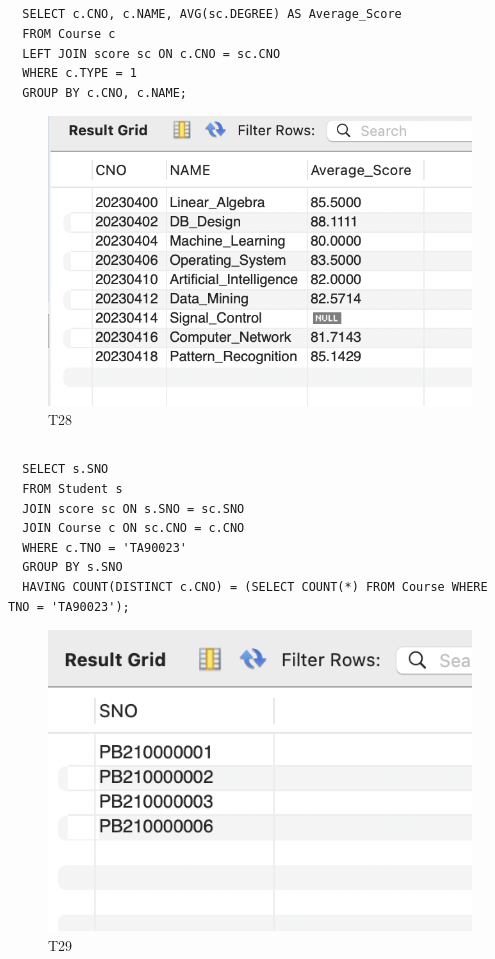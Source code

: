 \documentclass[UTF8]{ctexart}
\begin{document}
\subsection{}
\begin{lstlisting}
  SELECT c.CNO, c.NAME, AVG(sc.DEGREE) AS Average_Score
  FROM Course c
  LEFT JOIN score sc ON c.CNO = sc.CNO
  WHERE c.TYPE = 1
  GROUP BY c.CNO, c.NAME;  
\end{lstlisting}
\begin{figure}[H]
  \centering
  \includegraphics[scale=0.7]{pics/28.png}
  \caption*{T28}
\end{figure}

\subsection{}
\begin{lstlisting}
  SELECT s.SNO
  FROM Student s
  JOIN score sc ON s.SNO = sc.SNO
  JOIN Course c ON sc.CNO = c.CNO
  WHERE c.TNO = 'TA90023'
  GROUP BY s.SNO
  HAVING COUNT(DISTINCT c.CNO) = (SELECT COUNT(*) FROM Course WHERE TNO = 'TA90023');
\end{lstlisting}
\begin{figure}[H]
  \centering
  \includegraphics[scale=0.7]{pics/29.png}
  \caption*{T29}
\end{figure}
\end{document}
